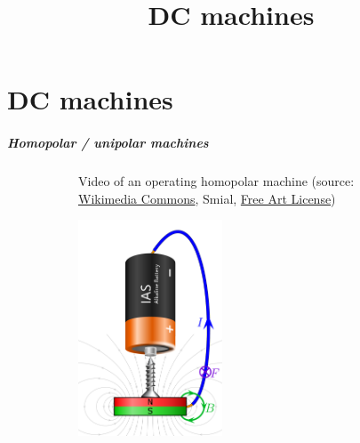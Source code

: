 \part{DC machines}
\title{DC machines}  
\date{}  
\frame{\titlepage} 

\begin{frame}
	\frametitle{Homopolar / unipolar machines}
    \vspace{-0.3cm}
	\begin{figure}
		\centering
		\begin{subfigure}[b]{0.49\textwidth}
			\centering
            \vspace{0.75cm}
			\caption{Video of an operating homopolar machine (source: \href{https://de.wikipedia.org/wiki/Datei:Homopolarmotor_MAQ03891_smial_wp.ogv}{Wikimedia Commons}, Smial, \href{https://artlibre.org/licence/lal/en/}{Free Art License})}
		\end{subfigure}
		\hfill
		\begin{subfigure}[b]{0.49\textwidth}
			\centering
			\includegraphics[width=0.47\textwidth]{fig/lec03/Homopolar_machine.pdf}

\end{subfigure}
\end{figure}
\end{frame}
